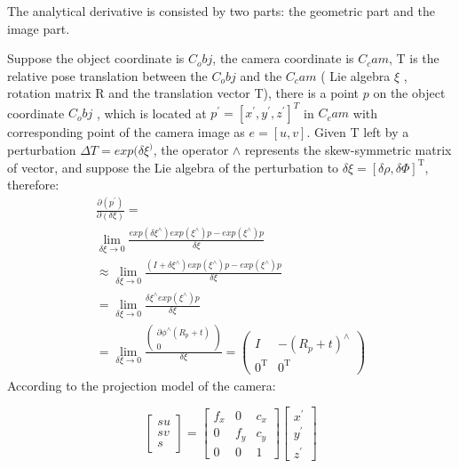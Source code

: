\documentclass{cta-author}
\begin{document}
The analytical derivative is consisted by two parts: the geometric part and the image part.

Suppose the object coordinate is $C_obj$, the camera coordinate is $C_cam$, T is the relative pose translation between the $C_obj$  and the $C_cam$ ( Lie algebra $\xi$ , rotation matrix R  and the translation vector T), there is a point $p$ on the object coordinate $C_obj$ , which is located at $p^{'}=[x^{'},y^{'},z^{'}]^T$ in $C_cam$ with corresponding point of the camera image as $e=[u,v]$. Given T left by a perturbation 
 $\Delta T=exp(\delta\xi^)$, the operator $\land$ represents the skew-symmetric matrix of vector, and suppose the Lie algebra of the perturbation to $\delta\xi=[\delta\rho,\delta\Phi]^\mathrm{T}$, therefore:
 \begin{equation}\label{eq10}
  \begin{split}
  \frac{\partial (p^{'})}{\partial (\delta\xi)} =\\
  \lim_{\delta\xi\rightarrow 0}\frac{exp(\delta\xi^{\land})exp(\xi^{\land})p-exp(\xi^{\land})p}{\delta\xi}\\
  \approx\lim_{\delta\xi\rightarrow 0}\frac{(I+\delta\xi^{\land})exp(\xi^{\land})p-exp(\xi^{\land})p}{\delta\xi}\\
  =\lim_{\delta\xi\rightarrow 0}\frac{\delta\xi^{\land}exp(\xi^{\land})p}{\delta\xi}\\
  =\lim_{\delta\xi\rightarrow 0}\frac{\begin{pmatrix}
  \partial\phi^{\land}(R_{p}+t) \\
    0
 \end{pmatrix}}{\delta\xi}=\begin{pmatrix}
  I & -(R_{p}+t)^{\land} \\
    0^\mathrm{T} & 0^\mathrm{T}
 \end{pmatrix}
\end{split}
\end{equation}
According to the projection model of the camera:

\begin{equation}\label{eq12}
  \begin{bmatrix} 
    su\\
      sv\\
      s
  \end{bmatrix} 
= \begin{bmatrix} 
        f_{x} & 0 & c_x \\
        0 & f_y & c_y\\
        0& 0 & 1
  \end{bmatrix}
  \begin{bmatrix} 
            x^{'}\\
            y^{'}\\
            z^{'}
  \end{bmatrix} 
\end{equation}
\end{document}
